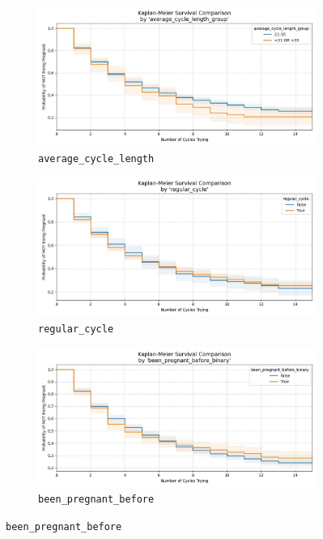 \documentclass[11pt]{article}
\begin{document}
\begin{figure}[h]
  \begin{subfigure}{0.45\textwidth}
    \includegraphics[width=\linewidth]{plots/survival_comparison_average_cycle_length_group.jpg}
    \caption{\texttt{average\_cycle\_length}}
  \end{subfigure}
  \hfill
  \begin{subfigure}{0.45\textwidth}
    \includegraphics[width=\linewidth]{plots/survival_comparison_regular_cycle.jpg}
    \caption{\texttt{regular\_cycle}}
  \end{subfigure}

  \vspace{0.3cm}

  \begin{subfigure}{0.45\textwidth}
    \includegraphics[width=\linewidth]{plots/survival_comparison_been_pregnant_before_binary.jpg}
    \caption{\texttt{been\_pregnant\_before}}
  \end{subfigure}


\end{figure}
\end{document}
